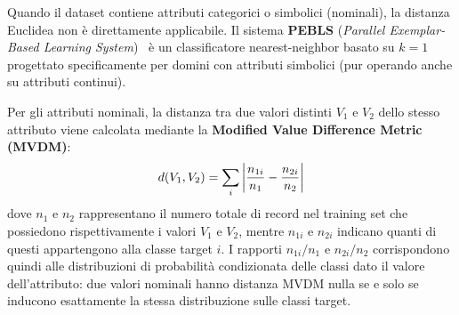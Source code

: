 Quando il dataset contiene attributi categorici o simbolici (nominali), la distanza Euclidea non \`e direttamente applicabile. Il sistema \textbf{PEBLS} (\textit{Parallel Exemplar-Based Learning System})~\cite{cost1993} \`e un classificatore nearest-neighbor basato su $k = 1$ progettato specificamente per domini con attributi simbolici (pur operando anche su attributi continui).

Per gli attributi nominali, la distanza tra due valori distinti $V_1$ e $V_2$ dello stesso attributo viene calcolata mediante la \textbf{Modified Value Difference Metric (MVDM)}:
\begin{equation}
    d(V_1, V_2) = \sum_{i} \left| \frac{n_{1i}}{n_1} - \frac{n_{2i}}{n_2} \right|
\end{equation}
dove $n_1$ e $n_2$ rappresentano il numero totale di record nel training set che possiedono rispettivamente i valori $V_1$ e $V_2$, mentre $n_{1i}$ e $n_{2i}$ indicano quanti di questi appartengono alla classe target $i$. I rapporti $n_{1i}/n_1$ e $n_{2i}/n_2$ corrispondono quindi alle distribuzioni di probabilit\`a condizionata delle classi dato il valore dell'attributo: due valori nominali hanno distanza MVDM nulla se e solo se inducono esattamente la stessa distribuzione sulle classi target.

